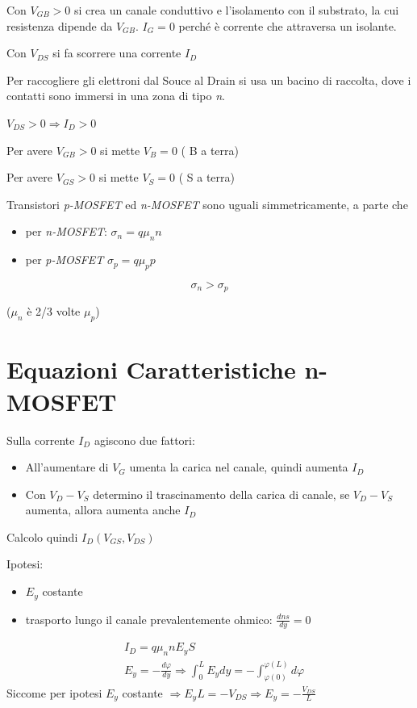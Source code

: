 \documentclass{article}
\begin{document}
Con $V_{GB} > 0$ si crea un canale conduttivo e l'isolamento con il substrato, la cui resistenza dipende da $V_{GB}$. $I_G = 0$ perché è corrente che attraversa un isolante.

Con $V_{DS}$ si fa scorrere una corrente $I_D$

Per raccogliere gli elettroni dal Souce al Drain si usa un bacino di raccolta, dove i contatti sono immersi in una zona di tipo \textit{n}.

$ V_{DS} > 0 \Rightarrow I_D > 0$

Per avere $V_{GB} > 0$ si mette $V_B = 0$ ( B a terra)

Per avere $V_{GS} > 0 $ si mette $V_S = 0$ ( S a terra)

Transistori \textit{p-MOSFET} ed \textit{n-MOSFET} sono uguali simmetricamente, a parte che
\begin{itemize}
    \item per \textit{n-MOSFET}: $ \sigma_n = q \mu_n n $
    \item per \textit{p-MOSFET} $ \sigma_p = q \mu_p p $
\end{itemize}
\[ \sigma_n > \sigma_p \]

($\mu_n$ è 2/3 volte $\mu_p$)



\section{Equazioni Caratteristiche n-MOSFET}
Sulla corrente $I_D$ agiscono due fattori:
\begin{itemize}
    \item All'aumentare di $V_G$ umenta la carica nel canale, quindi aumenta $I_D$ %
    \item Con $V_D - V_S$ determino il trascinamento della carica di canale, se $V_D - V_S$ aumenta, allora aumenta anche $I_D$
\end{itemize}

Calcolo quindi $I_D ( V_{GS}, V_{DS})$


Ipotesi:
\begin{itemize}
    \item $E_y$ costante
    \item trasporto lungo il canale prevalentemente ohmico: $\frac{dns}{dy} = 0$
\end{itemize}
\[
    \begin{aligned}
    &I_D = q \mu_n n E_y S\\
    &E_y = -\frac{d\varphi}{dy} \Rightarrow \int_0^L E_y dy = -\int_{\varphi(0)}^{\varphi(L)} d\varphi
    \end{aligned}
\]
Siccome per ipotesi $E_y$ costante $\Rightarrow E_y L = -V_{DS} \Rightarrow E_y = -\frac{V_{DS}}{L}$
\end{document}
